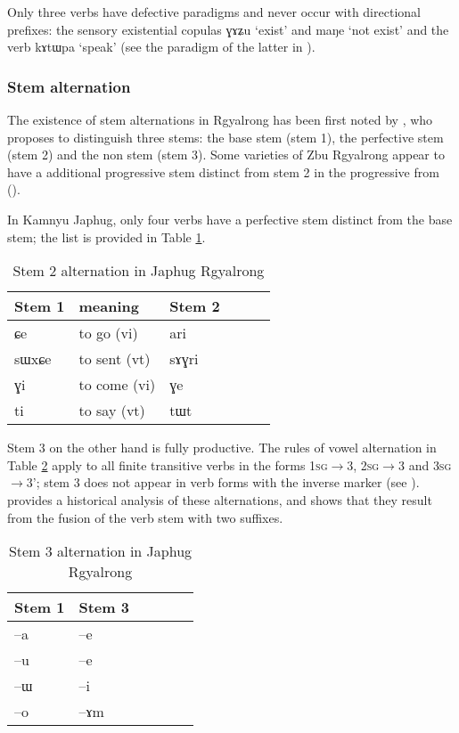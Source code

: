\documentclass[oldfontcommands,oneside,a4paper,11pt]{article}
\newcommand{\ipa}[1]{{\phon \mbox{#1}}} %
\begin{document}
Only three verbs have defective paradigms and never occur with directional prefixes: the sensory existential copulas \ipa{ɣɤʑu} `exist' and \ipa{maŋe} `not exist' and the verb \ipa{kɤtɯpa} `speak' (see the paradigm of the latter in \citealt[1215]{jacques12incorp}).

\subsubsection{Stem alternation} \label{sec:stem}
The existence of stem alternations in Rgyalrong has been first noted by \citet{jackson00puxi}, who proposes to distinguish three stems: the base stem (stem 1), the perfective stem (stem 2) and the non stem (stem 3). Some varieties of Zbu Rgyalrong appear to have a additional progressive stem distinct from stem 2 in the progressive from (\citealt[352]{jacques04these}).


In Kamnyu Japhug, only four verbs have a   perfective stem distinct from the base stem; the list is provided in Table \ref{tab:stem2}. 


 \begin{table} 
\caption{Stem 2 alternation in Japhug Rgyalrong} \label{tab:stem2} \centering
\begin{tabular}{llllll}
\toprule
Stem 1 & meaning &Stem 2 \\
\midrule
\ipa{ɕe}& to go (vi)&  \ipa{ari} \\
\ipa{sɯxɕe}& to sent (vt)  &\ipa{sɤɣri} \\
\ipa{ɣi}& to come (vi)  &\ipa{ɣe} \\
\ipa{ti}& to say (vt)  &\ipa{tɯt} \\
\bottomrule
\end{tabular}
\end{table}


Stem 3 on the other hand is fully productive. The rules of vowel alternation in Table \ref{tab:stem3} apply to all finite transitive verbs in the forms \textsc{1sg}$\rightarrow$3, \textsc{2sg}$\rightarrow$3 and \textsc{3sg}$\rightarrow$3'; stem 3 does not appear in verb forms with the inverse marker (see \citealt{gongxun12}). \citet[351-7]{jacques04these} provides a historical analysis of these alternations, and shows that they result from the fusion of the verb stem with two suffixes. %

 \begin{table} 
\caption{Stem 3 alternation in Japhug Rgyalrong} \label{tab:stem3} \centering
\begin{tabular}{llllll}
\toprule
Stem 1 & Stem 3 \\
\midrule
\ipa{--a} & \ipa{--e} \\
\ipa{--u} & \ipa{--e} \\
\ipa{--ɯ} & \ipa{--i} \\
\ipa{--o} & \ipa{--ɤm} \\
\bottomrule
\end{tabular}
\end{table}
\end{document}
